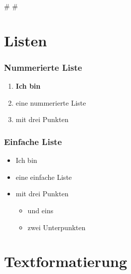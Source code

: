 
\def\mytitle{File Network: Fortschrittsberichte}
\def\myauthor{Anastasia Kazakova, Bengt Lüers}
\def\latexmode{beamer}
\def\latexxslt{beamer}
\def\theme{keynote-IntSysTheme}

\def\bibliocommand{}
\def\bibliostyle{chicago}

\# \#

\section{Listen}
\label{listen}

\begin{frame}

\frametitle{Nummerierte Liste}
\label{nummerierteliste}

\begin{enumerate}
\item \textbf{Ich bin}

\item eine nummerierte Liste

\item mit drei Punkten

\end{enumerate}

\end{frame}

\begin{frame}

\frametitle{Einfache Liste}
\label{einfacheliste}

\begin{itemize}
\item Ich bin

\item eine einfache Liste

\item mit drei Punkten

\begin{itemize}
\item und eins

\item zwei Unterpunkten

\end{itemize}

\end{itemize}

\end{frame}

\section{Textformatierung}
\label{textformatierung}

